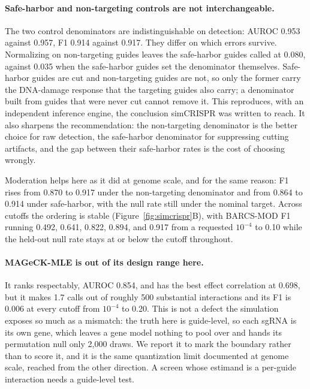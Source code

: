 \paragraph{Safe-harbor and non-targeting controls are not interchangeable.}
The two control denominators are indistinguishable on detection: AUROC 0.953
against 0.957, F1 0.914 against 0.917.  They differ on which errors survive.
Normalizing on non-targeting guides leaves the safe-harbor guides called at
0.080, against 0.035 when the safe-harbor guides set the denominator
themselves.  Safe-harbor guides are cut and non-targeting guides are not, so
only the former carry the DNA-damage response that the targeting guides also
carry; a denominator built from guides that were never cut cannot remove it.
This reproduces, with an independent inference engine, the conclusion
simCRISPR was written to reach.  It also sharpens the recommendation: the
non-targeting denominator is the better choice for raw detection, the
safe-harbor denominator for suppressing cutting artifacts, and the gap between
their safe-harbor rates is the cost of choosing wrongly.

Moderation helps here as it did at genome scale, and for the same reason:
F1 rises from 0.870 to 0.917 under the non-targeting denominator and from
0.864 to 0.914 under safe-harbor, with the null rate still under the nominal
target.  Across cutoffs the ordering is stable
(Figure~\ref{fig:simcrispr}B), with BARCS-MOD F1 running
0.492, 0.641, 0.822, 0.894, and 0.917 from a requested $10^{-4}$ to 0.10 while
the held-out null rate stays at or below the cutoff throughout.

\paragraph{MAGeCK-MLE is out of its design range here.}
It ranks respectably, AUROC 0.854, and has the best effect correlation at
0.698, but it makes 1.7 calls out of roughly 500 substantial interactions and
its F1 is 0.006 at every cutoff from $10^{-4}$ to 0.20.  This is not a defect
the simulation exposes so much as a mismatch: the truth here is guide-level,
so each sgRNA is its own gene, which leaves a gene model nothing to pool over
and hands its permutation null only 2,000 draws.  We report it to mark the
boundary rather than to score it, and it is the same quantization limit
documented at genome scale, reached from the other direction.  A screen whose
estimand is a per-guide interaction needs a guide-level test.

\clearpage
